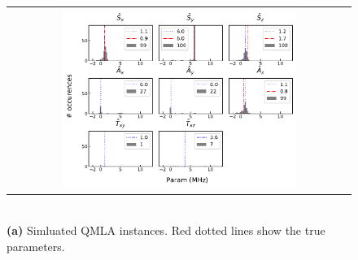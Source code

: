 
\begin{figure}
    \centering
    \begin{tabular}{@{}c@{}}
        \centering
        \includegraphics[width=0.7\textwidth]{experimental_study/figures/params_simulation.pdf}
    \end{tabular}
    \\ \small \textbf{(a)} Simluated QMLA instances. Red dotted lines show the true parameters.
    

\end{figure}

